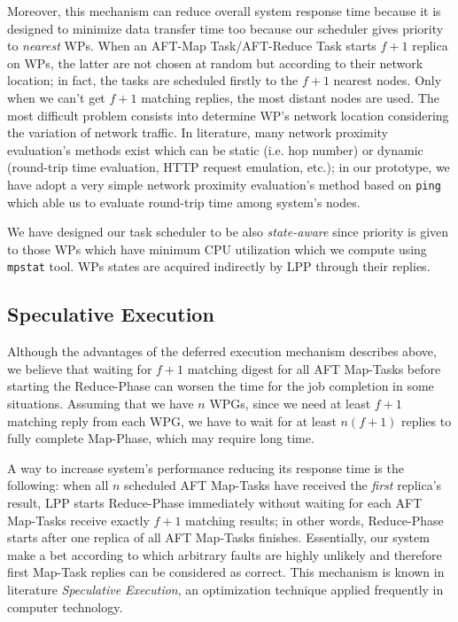 \documentclass[sigchi]{acmart}
\begin{document}
Moreover, this mechanism can reduce overall system response time because it is designed to minimize data transfer time too because our scheduler gives priority to \textit{nearest} WPs. When an AFT-Map Task/AFT-Reduce Task starts $f + 1$ replica on WPs, the latter are not chosen at random but according to their network location; in fact, the tasks are scheduled firstly to the $f + 1$ nearest nodes. Only when we can't get $f + 1$ matching replies, the most distant nodes are used. The most difficult problem consists into determine WP's network location considering the variation of network traffic. In literature, many network proximity evaluation's methods exist which can be static (i.e. hop number) or dynamic (round-trip time evaluation, HTTP request emulation, etc.); in our prototype, we have adopt a very simple network proximity evaluation's method based on \texttt{ping} which able us to evaluate round-trip time among system's nodes. 

We have designed our task scheduler to be also \textit{state-aware} since priority is given to those WPs which have minimum CPU utilization which we compute using \texttt{mpstat} tool. WPs states are acquired indirectly by LPP through their replies.

\subsection{Speculative Execution}

Although the advantages of the deferred execution mechanism describes above, we believe that waiting for $f + 1$ matching digest for all AFT Map-Tasks before starting the Reduce-Phase can worsen the time for the job completion in some situations. Assuming that we have $n$ WPGs, since we need at least $f + 1$ matching reply from each WPG, we have to wait for at least $n(f + 1)$ replies to fully complete Map-Phase, which may require long time.

A way to increase system's performance reducing its response time is the following: when all $n$ scheduled AFT Map-Tasks have received the \textit{first} replica's result, LPP starts Reduce-Phase immediately without waiting for each AFT Map-Tasks receive exactly $f + 1$ matching results; in other words, Reduce-Phase starts after one replica of all AFT Map-Tasks finishes. Essentially, our system make a bet according to which arbitrary faults are highly unlikely and therefore first Map-Task replies can be considered as correct. This mechanism is known in literature \textit{Speculative Execution}, an optimization technique applied frequently in computer technology.
\end{document}
